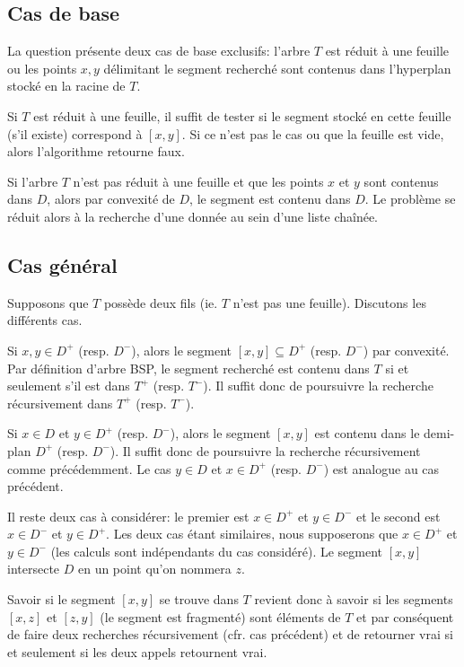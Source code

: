 
\subsection{Cas de base}
La question présente deux cas de base exclusifs: l'arbre $T$ est
réduit à une feuille ou les points $x, y$ délimitant le segment
recherché sont contenus dans l'hyperplan stocké en la racine de $T$.

Si $T$ est réduit à une feuille, il suffit de tester si le segment
stocké en cette feuille (s'il existe) correspond à $[x, y]$. Si ce
n'est pas le cas ou que la feuille est vide, alors l'algorithme
retourne faux.

Si l'arbre $T$ n'est pas réduit à une feuille et que
les points $x$ et $y$ sont contenus dans $D$, alors par convexité
de $D$, le segment est contenu dans $D$. Le problème se réduit alors
à la recherche d'une donnée au sein d'une liste chaînée.

\subsection{Cas général}
Supposons que $T$ possède deux fils (ie. $T$ n'est pas une feuille).
Discutons les différents cas.

Si $x,y \in D^+$ (resp. $D^-$), alors le segment $[x,y] \subseteq D^+$
(resp. $D^-$) par convexité. Par définition d'arbre BSP,
le segment recherché est contenu dans $T$ si et seulement s'il
est dans $T^+$ (resp. $T^-$). Il suffit donc de poursuivre la
recherche récursivement dans $T^+ $ (resp. $T^-$).

Si $x \in D $ et $y \in D^+$ (resp. $D^-$), alors le segment $[x, y]$ est
contenu dans le demi-plan $D^+$ (resp. $D^-$). Il suffit donc de poursuivre la
recherche récursivement comme précédemment. Le cas $y \in D $ et $x \in D^+$
(resp. $D^-$) est analogue au cas précédent.

Il reste deux cas à considérer: le premier est $ x \in D^+$ et $ y \in D^-$ et
le second est $x \in D^-$ et $ y \in D^+$. Les deux cas étant similaires,
nous supposerons que $ x \in D^+$ et $ y \in D^-$ (les calculs sont
indépendants du cas considéré).
Le segment $[x,y]$ intersecte $D$ en un point qu'on nommera $z$.

Savoir si le segment $[x,y]$ se trouve dans $T$ revient donc à savoir si
les segments $[x,z]$ et $[z,y]$ (le segment est fragmenté) sont
éléments de $T$ et par conséquent de faire deux recherches
récursivement (cfr. cas précédent) et de retourner vrai si et
seulement si les deux appels retournent vrai.

